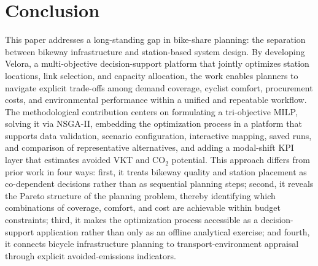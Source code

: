 \documentclass[preprint,authoryear,10pt]{elsarticle}
\begin{document}

\section{Conclusion}\label{conclusion}

This paper addresses a long-standing gap in bike-share planning: the separation between bikeway infrastructure and station-based system design. By developing Velora, a multi-objective decision-support platform that jointly optimizes station locations, link selection, and capacity allocation, the work enables planners to navigate explicit trade-offs among demand coverage, cyclist comfort, procurement costs, and environmental performance within a unified and repeatable workflow. The methodological contribution centers on formulating a tri-objective MILP, solving it via NSGA-II, embedding the optimization process in a platform that supports data validation, scenario configuration, interactive mapping, saved runs, and comparison of representative alternatives, and adding a modal-shift KPI layer that estimates avoided VKT and CO$_2$ potential. This approach differs from prior work in four ways: first, it treats bikeway quality and station placement as co-dependent decisions rather than as sequential planning steps; second, it reveals the Pareto structure of the planning problem, thereby identifying which combinations of coverage, comfort, and cost are achievable within budget constraints; third, it makes the optimization process accessible as a decision-support application rather than only as an offline analytical exercise; and fourth, it connects bicycle infrastructure planning to transport-environment appraisal through explicit avoided-emissions indicators.
\end{document}
